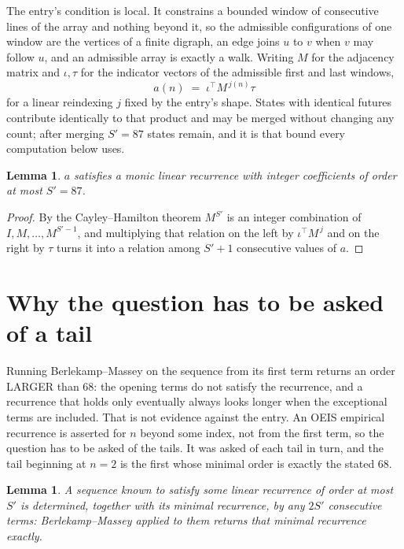 \documentclass[11pt,a4paper]{article}
\theoremstyle{plain}
\newtheorem{lemma}[theorem]{Lemma}
\theoremstyle{definition}
\begin{document}
The entry's condition is local. It constrains a bounded window of consecutive lines of the
array and nothing beyond it, so the admissible configurations of one window are the vertices of
a finite digraph, an edge joins $u$ to $v$ when $v$ may follow $u$, and an admissible array is
exactly a walk. Writing $M$ for the adjacency matrix and $\iota,\tau$ for the indicator vectors
of the admissible first and last windows,
\[
a(n)\;=\;\iota^{\!\top}M^{\,j(n)}\tau
\]
for a linear reindexing $j$ fixed by the entry's shape. States with identical futures
contribute identically to that product and may be merged without changing any count; after
merging $S'=87$ states remain, and it is that bound every computation below uses.

\begin{lemma}\label{lem:cf}
$a$ satisfies a monic linear recurrence with integer coefficients of order at most $S'=87$.
\end{lemma}

\begin{proof}
By the Cayley--Hamilton theorem $M^{S'}$ is an integer combination of $I,M,\dots,M^{S'-1}$,
and multiplying that relation on the left by $\iota^{\!\top}M^{\,j}$ and on the right by
$\tau$ turns it into a relation among $S'+1$ consecutive values of $a$.
\end{proof}

\section{Why the question has to be asked of a tail}

Running Berlekamp--Massey on the sequence from its first term returns an order LARGER than $68$: the opening terms do not satisfy the recurrence, and a recurrence that holds only eventually always looks longer when the exceptional terms are included. That is not evidence against the entry. An OEIS empirical recurrence is asserted for $n$ beyond some index, not from the first term, so the question has to be asked of the tails. It was asked of each tail in turn, and the tail beginning at $n=2$ is the first whose minimal order is exactly the stated $68$.

\begin{lemma}\label{lem:bm}
A sequence known to satisfy some linear recurrence of order at most $S'$ is determined,
together with its minimal recurrence, by any $2S'$ consecutive terms: Berlekamp--Massey applied
to them returns that minimal recurrence exactly.
\end{lemma}
\end{document}
